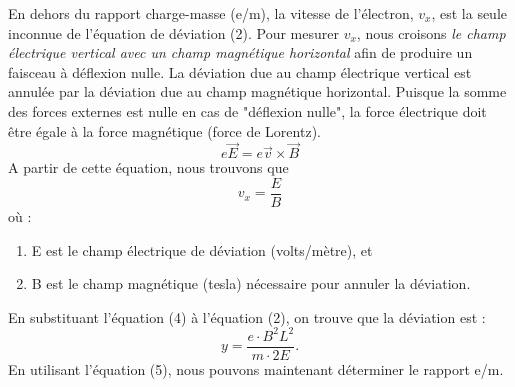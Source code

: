 \documentclass[../main.tex]{subfiles}
\begin{document}
En dehors du rapport charge-masse (e/m), la vitesse de l'électron, $v_x$, est la seule inconnue de l'équation de déviation (2).  Pour mesurer $v_x$, nous croisons \textit{le champ électrique vertical avec un champ magnétique horizontal} afin de produire un faisceau à déflexion nulle.  La déviation due au champ électrique vertical est annulée par la déviation due au champ magnétique horizontal.  Puisque la somme des forces externes est nulle en cas de "déflexion nulle", la force électrique doit être égale à la force magnétique (force de Lorentz).\\
$$e\overrightarrow{E} = e\overrightarrow{v} \times \overrightarrow{B}$$
A partir de cette équation, nous trouvons que\\
$$v_x = \frac{E}{B}$$
où :\\
\begin{enumerate}
    \item E est le champ électrique de déviation (volts/mètre), et 
    \item B est le champ magnétique (tesla) nécessaire pour annuler la déviation. 
\end{enumerate}
En substituant l'équation (4) à l'équation (2), on trouve que la déviation est :\\
$$y= \frac{e \cdot B^2 L^2}{m \cdot 2E}.$$
En utilisant l'équation (5), nous pouvons maintenant déterminer le rapport e/m. 
\end{document}
